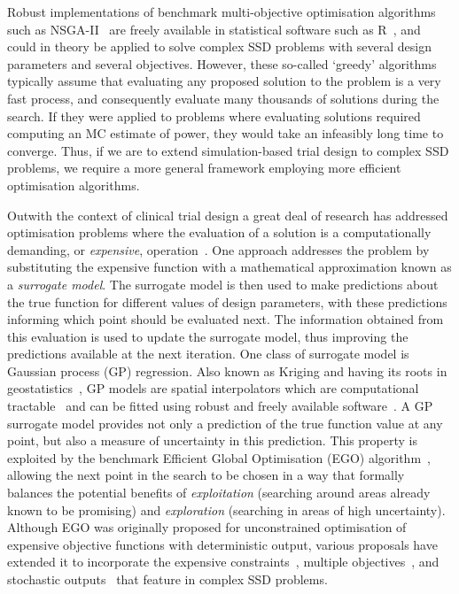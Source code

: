\documentclass{article} %
\begin{document}
Robust implementations of benchmark multi-objective optimisation algorithms such as NSGA-II~\cite{Deb2002} are freely available in statistical software such as R~\cite{Mersmann2014}, and could in theory be applied to solve complex SSD problems with several design parameters and several objectives. However, these so-called `greedy' algorithms typically assume that evaluating any proposed solution to the problem is a very fast process, and consequently evaluate many thousands of solutions during the search. If they were applied to problems where evaluating solutions required computing an MC estimate of power, they would take an infeasibly long time to converge. Thus, if we are to extend simulation-based trial design to complex SSD problems, we require a more general framework employing more efficient optimisation algorithms. 

Outwith the context of clinical trial design a great deal of research has addressed optimisation problems where the evaluation of a solution is a computationally demanding, or \emph{expensive}, operation~\cite{Sacks1989,Santner2003}. One approach addresses the problem by substituting the expensive function with a mathematical approximation known as a \emph{surrogate model}. The surrogate model is then used to make predictions about the true function for different values of design parameters, with these predictions informing which point should be evaluated next. The information obtained from this evaluation is used to update the surrogate model, thus improving the predictions available at the next iteration. One class of surrogate model is Gaussian process (GP) regression. Also known as Kriging and having its roots in geostatistics~\cite{Krige1951}, GP models are spatial interpolators which are computational tractable~\cite{Rasmussen2006} and can be fitted using robust and freely available software~\cite{Roustant2012}. A GP surrogate model provides not only a prediction of the true function value at any point, but also a measure of uncertainty in this prediction. This property is exploited by the benchmark Efficient Global Optimisation (EGO) algorithm~\cite{Jones2001}, allowing the next point in the search to be chosen in a way that formally balances the potential benefits of \emph{exploitation} (searching around areas already known to be promising) and \emph{exploration} (searching in areas of high uncertainty). Although EGO was originally proposed for unconstrained optimisation of expensive objective functions with deterministic output, various proposals have extended it to incorporate the expensive constraints~\cite{Sasena2002}, multiple objectives~\cite{Emmerich2011}, and stochastic outputs~\cite{Picheny2014} that feature in complex SSD problems.
\end{document}
